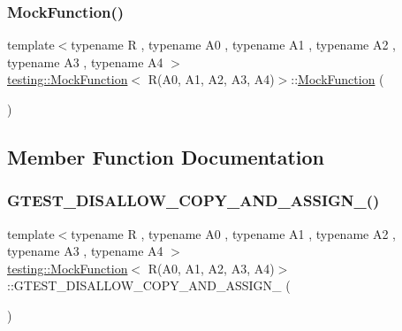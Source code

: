 \subsubsection{\texorpdfstring{MockFunction()}{MockFunction()}}
{\footnotesize\ttfamily template$<$typename R , typename A0 , typename A1 , typename A2 , typename A3 , typename A4 $>$ \\
\mbox{\hyperlink{classtesting_1_1_mock_function}{testing\+::\+Mock\+Function}}$<$ R(A0, A1, A2, A3, A4)$>$\+::\mbox{\hyperlink{classtesting_1_1_mock_function}{Mock\+Function}} (\begin{DoxyParamCaption}{ }\end{DoxyParamCaption})\hspace{0.3cm}{\ttfamily [inline]}}



\subsection{Member Function Documentation}
\mbox{\label{classtesting_1_1_mock_function_3_01_r_07_a0_00_01_a1_00_01_a2_00_01_a3_00_01_a4_08_4_aa38af486d20b1017608703b99987a955}} 
\subsubsection{\texorpdfstring{GTEST\_DISALLOW\_COPY\_AND\_ASSIGN\_()}{GTEST\_DISALLOW\_COPY\_AND\_ASSIGN\_()}}
{\footnotesize\ttfamily template$<$typename R , typename A0 , typename A1 , typename A2 , typename A3 , typename A4 $>$ \\
\mbox{\hyperlink{classtesting_1_1_mock_function}{testing\+::\+Mock\+Function}}$<$ R(A0, A1, A2, A3, A4)$>$\+::G\+T\+E\+S\+T\+\_\+\+D\+I\+S\+A\+L\+L\+O\+W\+\_\+\+C\+O\+P\+Y\+\_\+\+A\+N\+D\+\_\+\+A\+S\+S\+I\+G\+N\+\_\+ (\begin{DoxyParamCaption}\item[{\mbox{\hyperlink{classtesting_1_1_mock_function}{Mock\+Function}}$<$ R(A0, A1, A2, A3, A4)$>$}]{ }\end{DoxyParamCaption})\hspace{0.3cm}{\ttfamily [private]}}

